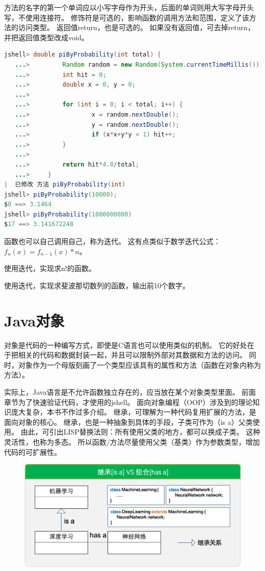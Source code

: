 \noindent
方法的名字的第一个单词应以小写字母作为开头，后面的单词则用大写字母开头写，不使用连接符。
修饰符是可选的，影响函数的调用方法和范围，定义了该方法的访问类型。
返回值return，也是可选的。
如果没有返回值，可去掉return，并把返回值类型改成void。
\bigskip
\begin{lstlisting}[language=Java, backgroundcolor=\color{lightgray!10}]
	jshell> double piByProbability(int total) {
   ...>         Random random = new Random(System.currentTimeMillis());
   ...>         int hit = 0;
   ...>         double x = 0, y = 0;
   ...> 
   ...>         for (int i = 0; i < total; i++) {
   ...>                 x = random.nextDouble();
   ...>                 y = random.nextDouble();
   ...>                 if (x*x+y*y < 1) hit++;
   ...>         }
   ...> 
   ...>         return hit*4.0/total;
   ...>     }
|  已修改 方法 piByProbability(int)
jshell> piByProbability(10000);
$8 ==> 3.1464
jshell> piByProbability(1000000000)
$17 ==> 3.141672248
\end{lstlisting}

\noindent
函数也可以自己调用自己，称为迭代。
这有点类似于数学迭代公式：$f_n(x) = f_{n-1}(x)*n$。

\bigskip
\begin{exercise}
	使用迭代，实现求n!的函数。
\end{exercise}

\begin{exercise}
	使用迭代，实现求斐波那切数列的函数，输出前10个数字。
\end{exercise}

\section{Java对象}
对象是代码的一种编写方式，即使是C语言也可以使用类似的机制。
它的好处在于把相关的代码和数据封装一起，并且可以限制外部对其数据和方法的访问。
同时，对象作为一个母版刻画了一个类型应该具有的属性和方法（函数在对象内称为方法）。

实际上，Java语言是不允许函数独立存在的，应当放在某个对象类型里面。
前面章节为了快速验证代码，才使用的jshell。
面向对象编程（OOP）涉及到的理论知识庞大复杂，本书不作过多介绍。
继承，可理解为一种代码复用扩展的方法，是面向对象的核心。
继承，也是一种抽象到具体的手段，子类可作为（is a）父类使用。
由此，可引出LISP替换法则：所有使用父类的地方，都可以换成子类。
这种灵活性，也称为多态。
所以函数/方法尽量使用父类（基类）作为参数类型，增加代码的可扩展性。

\begin{figure}[!htb]
	\centerline{\includegraphics[scale=0.7]{part1/has-a-is-a.png}}
\end{figure}

